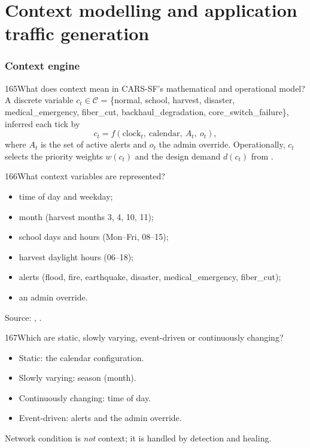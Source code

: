 \part{Context modelling and application traffic generation}

\section{Context engine}

\begin{qa}{165}{What does context mean in CARS-SF's mathematical and operational model?}
A discrete variable $c_t\in\mathcal{C}$ = \{normal, school, harvest, disaster, medical\_emergency, fiber\_cut,
backhaul\_degradation, core\_switch\_failure\}, inferred each tick by
\[
c_t=f(\text{clock}_t,\ \text{calendar},\ A_t,\ o_t),
\]
where $A_t$ is the set of active alerts and $o_t$ the admin override.
Operationally, $c_t$ selects the priority weights $w(c_t)$ and the design demand $d(c_t)$ from
.
\end{qa}

\begin{qa}{166}{What context variables are represented?}
\begin{itemize}
\item time of day and weekday;
\item month (harvest months 3, 4, 10, 11);
\item school days and hours (Mon--Fri, 08--15);
\item harvest daylight hours (06--18);
\item alerts (flood, fire, earthquake, disaster, medical\_emergency, fiber\_cut);
\item an admin override.
\end{itemize}
Source: , .
\end{qa}

\begin{qa}{167}{Which are static, slowly varying, event-driven or continuously changing?}
\begin{itemize}
\item Static: the calendar configuration.
\item Slowly varying: season (month).
\item Continuously changing: time of day.
\item Event-driven: alerts and the admin override.
\end{itemize}
Network condition is \emph{not} context; it is handled by detection and healing.
\end{qa}

